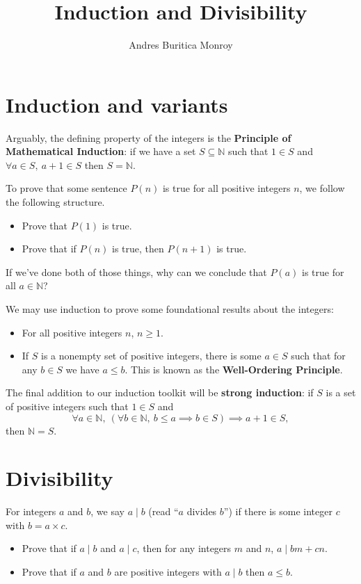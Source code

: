 \documentclass{article}
\title{Induction and Divisibility}
\author{Andres Buritica Monroy}
\date{}
\begin{document}
\maketitle
\section{Induction and variants}
Arguably, the defining property of the integers is the \textbf{Principle of
	Mathematical Induction}: if we have a set $S\subseteq\mathbb N$ such that
$1\in S$ and $\forall a\in S,\ a+1\in S$ then $S=\mathbb N$.

To prove that some sentence $P(n)$ is true for all positive integers $n$, we
follow the following structure.
\begin{itemize}
	\item Prove that $P(1)$ is true.
	\item Prove that if $P(n)$ is true, then $P(n+1)$ is true.
\end{itemize}
If we've done both of those things, why can we conclude that $P(a)$ is true
for all $a\in\mathbb N$?

We may use induction to prove some foundational results about the integers:
\begin{itemize}
	\item For all positive integers $n$, $n\ge 1$.
	\item If $S$ is a nonempty set of positive integers, there is some $a\in
		      S$ such that for any $b\in S$ we have $a\le b$.
	      This is known as the \textbf{Well-Ordering Principle}.
\end{itemize}

The final addition to our induction toolkit will be \textbf{strong induction}:
if $S$ is a set of positive integers such that $1\in S$ and
\[\forall a\in \mathbb N,\ (\forall b\in\mathbb N,\ b\le a\implies b\in
	S)\implies a+1\in S,\]
then $\mathbb N=S$.
\section{Divisibility}
For integers $a$ and $b$, we say $a\mid b$ (read ``$a$ divides
$b$'') if there is some integer $c$ with $b=a\times c$.
\begin{itemize}
	\item Prove that if $a\mid b$ and $a\mid c$, then for any integers $m$ and
	      $n$, $a\mid bm+cn$.
	\item Prove that if $a$ and $b$ are positive integers with $a\mid b$ then
	      $a\le b$.
\end{itemize}
\end{document}
